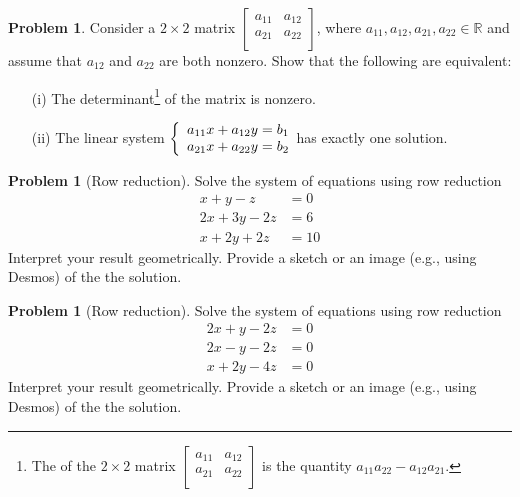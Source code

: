 \documentclass[10pt]{article}
\theoremstyle{definition}
\newtheorem{problem}[theorem]{Problem}
\newcommand{\1}[1]{\textbf{1}_{\left[#1\right]}} %
\def\R{\mathbb{R}} %
\newcommand{\dempfcolor}[1]{{\color{RoyalBlue}#1}}
\newcommand{\demph}[1]{\dempfcolor{{\sl #1}}}
\begin{document}
\begin{problem}
  Consider a $2\times 2$  matrix $\begin{bmatrix}
    a_{11}&a_{12}\\
    a_{21}&a_{22}\\
  \end{bmatrix}$, where $a_{11},a_{12},a_{21},a_{22}\in \R$ and assume that $a_{12}$ and
  $a_{22}$ are both nonzero. Show that the following are equivalent:
  \begin{enumerate}
    \item[(i)] The determinant\footnote{The \demph{determinant} of the
      $2\times 2$ matrix $
      \begin{bmatrix}
        a_{11}&a_{12}\\
        a_{21}&a_{22}\\
      \end{bmatrix}$
      is the quantity $a_{11}a_{22}-a_{12}a_{21}$.} of the matrix is nonzero.
    \item[(ii)] The linear system
    $\left\{ \begin{array}{l@{}l} a_{11}x+a_{12}y=b_{1} \\
        a_{21}x+a_{22}y=b_{2} \end{array}\right.$ has exactly one solution.
  \end{enumerate}
\end{problem}


\begin{problem}[Row reduction]
  Solve the system of equations using row reduction
  \begin{align*}
    x+y-z&=0\\
    2x+3y-2z&=6\\
    x+2y+2z&=10
  \end{align*}
  Interpret your result geometrically. Provide a sketch or an image (e.g.,
  using Desmos) of the the solution.
\end{problem}

\begin{problem}[Row reduction]
  Solve the system of equations using row reduction
  \begin{align*}
    2x+y-2z&=0\\
    2x-y-2z&=0\\
    x+2y-4z&=0
  \end{align*}
  Interpret your result geometrically. Provide a sketch or an image (e.g.,
  using Desmos) of the the solution.
\end{problem}
\end{document}
